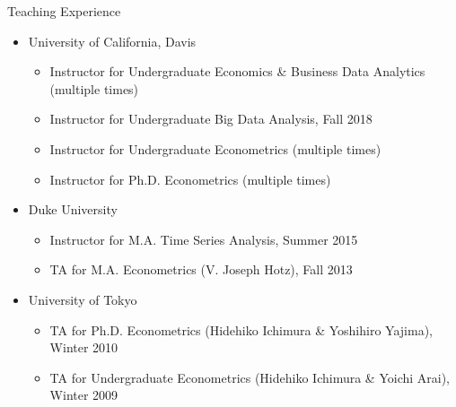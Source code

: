 \documentclass{article}
\begin{document}
\newpage\noindent Teaching Experience 
\begin{itemize}
\item[] University of California, Davis
\begin{itemize}
\item[] Instructor for Undergraduate Economics \& Business Data Analytics   (multiple times)\item[] Instructor for Undergraduate Big Data Analysis,  Fall 2018 
\item[] Instructor for Undergraduate Econometrics   (multiple times)
\item[] Instructor for Ph.D. Econometrics  (multiple times)
\end{itemize}
\item[] Duke University
\begin{itemize}
\item[] Instructor for M.A. Time Series Analysis, Summer 2015 
\item[] TA for M.A. Econometrics  (V. Joseph Hotz), Fall 2013 
\end{itemize}
\item[] University of Tokyo
\begin{itemize}
\item[] TA for Ph.D. Econometrics (Hidehiko Ichimura \& Yoshihiro Yajima), Winter 2010 
\item[] TA for Undergraduate Econometrics (Hidehiko Ichimura \& Yoichi Arai), Winter 2009 
\end{itemize}
\end{itemize}
 
\end{document}

